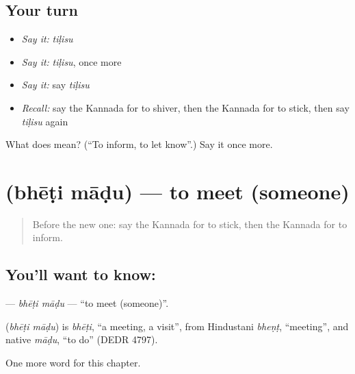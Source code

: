 \subsection*{Your turn}
\begin{itemize}
\raggedright
  \item \emph{Say it:} \emph{tiḷisu}
  \item \emph{Say it:} \emph{tiḷisu}, once more
  \item \emph{Say it:} say \emph{tiḷisu}
  \item \emph{Recall:} say the Kannada for to shiver, then the Kannada for to stick, then say \emph{tiḷisu} again
\end{itemize}

\begin{tcolorbox}[breakable,colback=teal!4,colframe=teal!35!black,title={Before you move on}]
What does  mean? (\textquotedblleft{}To inform, to let know\textquotedblright{}.) Say it once more.
\end{tcolorbox}
\section[\texorpdfstring{\kn{ಭೇಟಿ} \kn{ಮಾಡು} (bhēṭi māḍu)}{ಭೇಟಿ ಮಾಡು (bhēṭi māḍu)}]{  (bhēṭi māḍu) — to meet (someone)}

\label{lesson:KA-C161-bheti-madu}



\begin{quote}
Before the new one: say the Kannada for to stick, then the Kannada for to inform.
\end{quote}

\subsection*{You'll want to know:  }
\textbf{ } — \emph{bhēṭi māḍu} — \textquotedblleft{}to meet (someone)\textquotedblright{}.

\begin{cousinweb}
\textbf{ } (\emph{bhēṭi māḍu}) is \emph{bhēṭi}, \textquotedblleft{}a meeting, a visit\textquotedblright{}, from Hindustani \emph{bheṇṭ}, \textquotedblleft{}meeting\textquotedblright{}, and native \emph{māḍu}, \textquotedblleft{}to do\textquotedblright{} (DEDR 4797).
\end{cousinweb}

\begin{grammarlens}[title={What you've built}]
One more word for this chapter.
\end{grammarlens}

